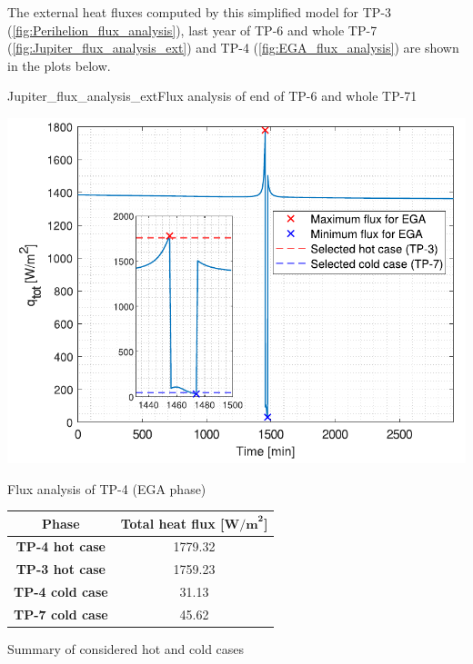 The external heat fluxes computed by this simplified model for TP-3 (\autoref{fig:Perihelion_flux_analysis}), last year of TP-6 and whole TP-7 (\autoref{fig:Jupiter_flux_analysis_ext}) and TP-4 (\autoref{fig:EGA_flux_analysis}) are shown in the plots below.

    {Jupiter_flux_analysis_ext}{Flux analysis of end of TP-6 and whole TP-7}{1}

\begin{minipage}{0.5\linewidth}
    \centering
    \captionsetup{type=figure}
    \includegraphics[width=\linewidth]{Images/EGA_flux_analysis.pdf}
    \caption{Flux analysis of TP-4 (EGA phase)}
    \label{fig:EGA_flux_analysis}
\end{minipage}\hfill
\begin{minipage}{0.5\linewidth}
    \centering
    \captionsetup{type=table}
    \renewcommand{\arraystretch}{1.4}
    \begin{tabular}{|c|c|}
        \hline
        \textbf{Phase} &
        \textbf{Total heat flux [$\boldsymbol{\textbf{W/m}^2}$]} \\
        \hline
        \hline
        \textbf{TP-4 hot case}      & 1779.32   \\
        \hline
        \textbf{TP-3 hot case}      & 1759.23   \\
        \hline
        \hline
        \textbf{TP-4 cold case}     & 31.13     \\
        \hline
        \textbf{TP-7 cold case}     & 45.62     \\
        \hline
    \end{tabular}
    \caption{Summary of considered hot and cold cases}
    \label{table:cases}
\end{minipage}

